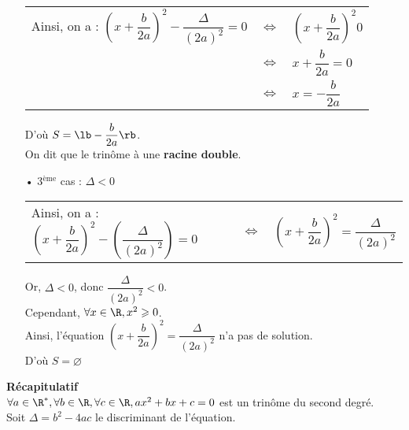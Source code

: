 \begin{itemize}
\begin{tabular}{lll}
Ainsi, on a : $\left(x + \dfrac{b}{2a} \right)^2 - \dfrac{\Delta}{\left(2a\right)^2} = 0$ & $\Longleftrightarrow$ & $\left(x + \dfrac{b}{2a} \right)^2  0$ \\
& $\Longleftrightarrow$ & $x + \dfrac{b}{2a} = 0$ \\
& $\Longleftrightarrow$ & $x = -\dfrac{b}{2a}$ \\
\end{tabular}

\vspace*{.3cm}

D'où $ S = \lb -\dfrac{b}{2a} \rb $. \\ 

On dit que le trinôme à une \textbf{racine double}. \\

\item[•]3$^\mathrm{ème}$ cas : $\Delta < 0$ \\

\begin{tabular}{lll}
Ainsi, on a : $\left(x + \dfrac{b}{2a} \right)^2 - \left(  \dfrac{\Delta}{\left(2a\right)^2}\right) = 0$ & $\Longleftrightarrow$ & $\left(x + \dfrac{b}{2a}\right)^2 = \dfrac{\Delta}{\left(2a\right)^2}$ \\
\end{tabular}

\vspace*{.3cm}

Or, $\Delta < 0$, donc $\dfrac{\Delta}{\left(2a\right)^2} < 0$. \\

Cependant, $\forall x \in \R, x^2 \geqslant 0$. \\

Ainsi, l'équation $\left(x + \dfrac{b}{2a}\right)^2 = \dfrac{\Delta}{\left(2a\right)^2}$ n'a pas de solution. \\

D'où $S = \varnothing$
\end{itemize}

\vspace*{.3cm}

\textbf{Récapitulatif} \\

$\forall a \in \R^*, \forall b \in \R, \forall c \in \R, ax^2 + bx + c = 0$ est un trinôme du second degré. \\

Soit $\Delta = b^2 - 4ac$ le discriminant de l'équation. \\

